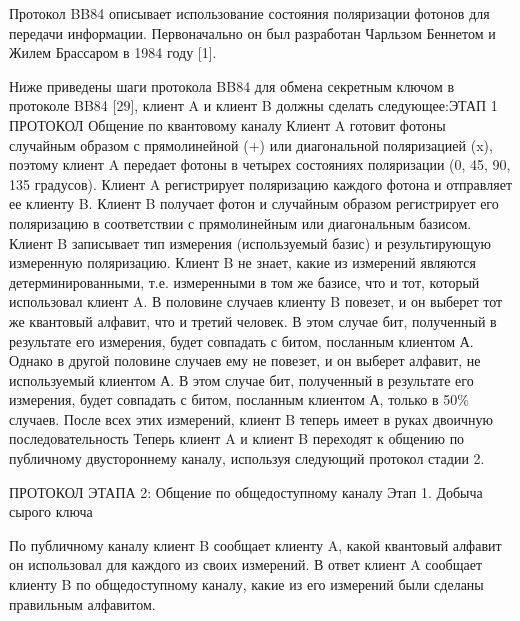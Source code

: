 Протокол BB84 описывает использование состояния поляризации фотонов для передачи информации. Первоначально он был разработан Чарльзом Беннетом и Жилем Брассаром в 1984 году [1].

Ниже приведены шаги протокола BB84 для обмена секретным ключом в протоколе BB84 [29], клиент A и клиент B должны сделать следующее:ЭТАП 1 ПРОТОКОЛ Общение по квантовому каналу
Клиент A готовит фотоны случайным образом с прямолинейной (+) или диагональной поляризацией (x), поэтому клиент A передает фотоны в четырех состояниях поляризации (0, 45, 90, 135 градусов).
Клиент A регистрирует поляризацию каждого фотона и отправляет ее клиенту B.
Клиент B получает фотон и случайным образом регистрирует его поляризацию в соответствии с прямолинейным или диагональным базисом. Клиент B записывает тип измерения (используемый базис) и результирующую измеренную поляризацию.
Клиент B не знает, какие из измерений являются детерминированными, т.е. измеренными в том же базисе, что и тот, который использовал клиент A. В половине случаев клиенту B повезет, и он выберет тот же квантовый алфавит, что и третий человек. В этом случае бит, полученный в результате его измерения, будет совпадать с битом, посланным клиентом А. Однако в другой половине случаев ему не повезет, и он выберет алфавит, не используемый клиентом А. В этом случае бит, полученный в результате его измерения, будет совпадать с битом, посланным клиентом А, только в 50\% случаев. После всех этих измерений, клиент B теперь имеет в руках двоичную последовательность 
Теперь клиент A и клиент B переходят к общению по публичному двустороннему каналу, используя следующий протокол стадии 2.

ПРОТОКОЛ ЭТАПА 2: Общение по общедоступному каналу
Этап 1. Добыча сырого ключа

По публичному каналу клиент B сообщает клиенту A, какой квантовый алфавит он использовал для каждого из своих измерений.
В ответ клиент A сообщает клиенту B по общедоступному каналу, какие из его измерений были сделаны правильным алфавитом.

